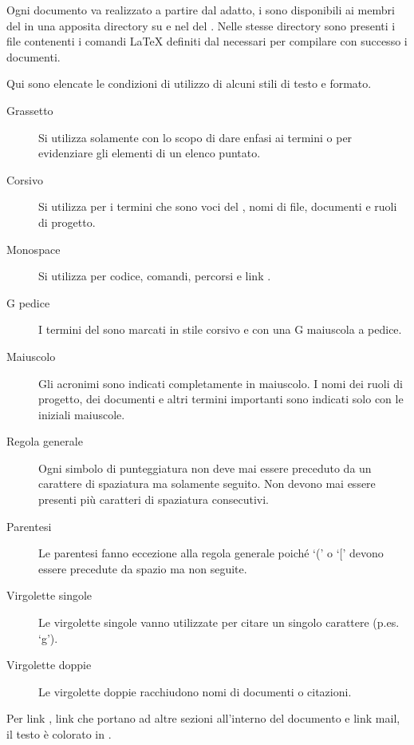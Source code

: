 \documentclass[a4paper, titlepage]{article}
\begin{document}
Ogni documento va realizzato a partire dal  adatto, i  sono disponibili ai membri del  in una apposita directory su  e nel   del .
Nelle stesse directory sono presenti i file contenenti i comandi \LaTeX{} definiti dal  necessari per compilare con successo i documenti.

Qui sono elencate le condizioni di utilizzo di alcuni stili di testo e formato.

\begin{description}
	\item[Grassetto] 
	Si utilizza solamente con lo scopo di dare enfasi ai termini o per evidenziare gli elementi di un elenco puntato.
	\item[Corsivo] 
	Si utilizza per i termini che sono voci del , nomi di file, documenti e ruoli di progetto.
	\item[Monospace] 
	 Si utilizza per codice, comandi, percorsi e link .
	 \item[G pedice]
	 I termini del  sono marcati in stile corsivo e con una G maiuscola a pedice.
	 \item[Maiuscolo]
	 Gli acronimi sono indicati completamente in maiuscolo. I nomi dei ruoli di progetto, dei documenti e altri termini importanti sono indicati solo con le iniziali maiuscole.
\end{description}

\begin{description}
	\item[Regola generale] 
	Ogni simbolo di punteggiatura non deve mai essere preceduto da un carattere di spaziatura ma solamente seguito. Non devono mai essere presenti più caratteri di spaziatura consecutivi.
	\item[Parentesi] 
	Le parentesi fanno eccezione alla regola generale poiché `(' o `[' devono essere precedute da spazio ma non seguite.
	\item[Virgolette singole] 
	Le virgolette singole vanno utilizzate per citare un singolo carattere (p.es. `g').
	\item[Virgolette doppie] 
	Le virgolette doppie racchiudono nomi di documenti o citazioni.
\end{description}

Per link , link che portano ad altre sezioni all'interno del documento e link mail, il testo è colorato in \crule[blue].
\end{document}
